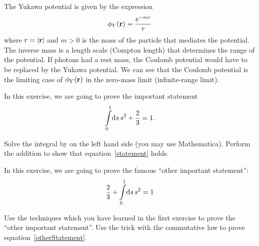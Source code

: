 \documentclass{assignment}
\begin{document}
The Yukawa potential is given by the expression
\begin{align}
    \phi_Y(\mathbf{r}) = \frac{\operatorname{e}^{-mr}}{r}
\end{align}
where $r=|\mathbf{r}|$ and $m > 0$ is the mass of the particle that mediates
the potential. The inverse mass is a length scale (Compton length)
that determines the range of the potential. If photons had a rest
mass, the Coulomb potential would have to be replaced by the Yukawa
potential. We can see that the Coulomb potential is the limiting case of
$\phi_Y(\mathbf{r})$ in the zero-mass limit (infinite-range limit).

\begin{exercises}

In this exercise, we are going to prove the important statement
\begin{align}
    \int\limits_{0}^{1} \! \mathrm{d} s\, s^2 + \frac{2}{3} = 1.  \label{statement}
\end{align}
\begin{tasks}
    \task Solve the integral by on the left hand side (you may use
          Mathematica).
    \task Perform the addition to show that equation~\eqref{statement}
          holds.
\end{tasks}

In this exercise, we are going to prove the famous ``other important
statement'':
\begin{align}
    \frac{2}{3} + \int\limits_{0}^{1} \! \mathrm{d} s\, s^2 = 1
    \label{otherStatement}
\end{align}
\begin{tasks}
    \task Use the techniques which you have learned in the first
          exercise to prove the ``other important statement''.
    \task Use the trick with the commutative law to prove
          equation~\eqref{otherStatement}.
\end{tasks}

\end{exercises}
\end{document}

